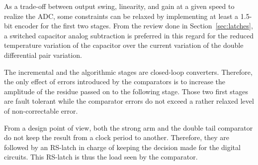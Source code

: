 As a trade-off between output swing, linearity, and gain at a given speed to realize the ADC, some constraints can be relaxed by implementing at least a 1.5-bit encoder for the first two stages. From the review done in Section~\ref{sec:latches}, a switched capacitor analog subtraction is preferred in this regard for the reduced temperature variation of the capacitor over the current variation of the double differential pair variation.

The incremental  and the algorithmic stages are closed-loop converters. Therefore, the only effect of errors introduced by the comparators is to increase the amplitude of the residue passed on to the following stage. Those two first stages are fault tolerant while the comparator errors do not exceed a rather relaxed level of non-correctable error. 

From a design point of view, both the strong arm and the double tail comparator do not keep the result from a clock period to another. Therefore, they are followed by an RS-latch in charge of keeping the decision made for the digital circuits. This RS-latch is thus the load seen by the comparator.

